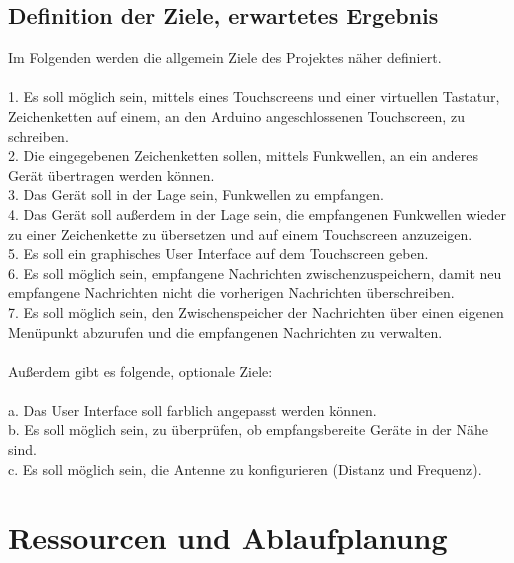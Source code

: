 \documentclass[a4paper, 11pt]{scrartcl}
\begin{document}
\subsection{Definition der Ziele, erwartetes Ergebnis}\label{ch:goals}
Im Folgenden werden die allgemein Ziele des Projektes näher definiert.
\\
\\
1. Es soll möglich sein, mittels eines Touchscreens und einer virtuellen Tastatur, Zeichenketten auf einem, an den Arduino angeschlossenen Touchscreen, zu schreiben.
\\
2. Die eingegebenen Zeichenketten sollen, mittels Funkwellen, an ein anderes Gerät übertragen werden können.
\\
3. Das Gerät soll in der Lage sein, Funkwellen zu empfangen.
\\
4. Das Gerät soll außerdem in der Lage sein, die empfangenen Funkwellen wieder zu einer Zeichenkette zu übersetzen und auf einem Touchscreen anzuzeigen.
\\
5. Es soll ein graphisches User Interface auf dem Touchscreen geben.
\\
6. Es soll möglich sein, empfangene Nachrichten zwischenzuspeichern, damit neu empfangene Nachrichten nicht die vorherigen Nachrichten überschreiben.
\\
7. Es soll möglich sein, den Zwischenspeicher der Nachrichten über einen eigenen Menüpunkt abzurufen und die empfangenen Nachrichten zu verwalten.
\\
\\
Außerdem gibt es folgende, optionale Ziele:
\\
\\
a. Das User Interface soll farblich angepasst werden können.
\\
b. Es soll möglich sein, zu überprüfen, ob empfangsbereite Geräte in der Nähe sind.
\\
c. Es soll möglich sein, die Antenne zu konfigurieren (Distanz und Frequenz).


\section{Ressourcen und Ablaufplanung}
\end{document}
